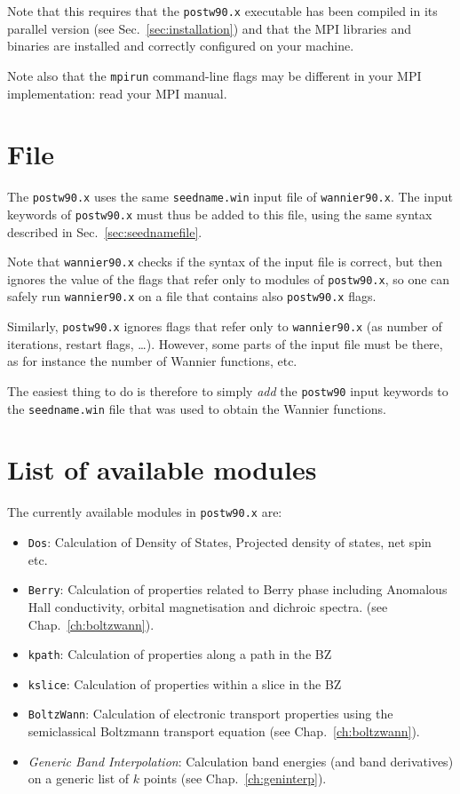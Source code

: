 Note that this requires that the {\tt postw90.x} executable has been
compiled in its parallel version (see Sec.~\ref{sec:installation}) and
that the MPI libraries and binaries are installed and correctly
configured on your machine.

Note also that the {\tt mpirun} command-line flags may be different in your MPI implementation: read your MPI manual.


\section{ File}
The \texttt{postw90.x} uses the same \texttt{seedname.win} input file
of \texttt{wannier90.x}. The input keywords of \texttt{postw90.x} must
thus be added to this file, using the same syntax described in
Sec.~\ref{sec:seednamefile}. 

Note that \texttt{wannier90.x} checks if the syntax of the input file
is correct, but then ignores the value of the flags that refer only to
modules of \texttt{postw90.x}, so one can safely run
\texttt{wannier90.x} on a file that contains also \texttt{postw90.x}
flags.

Similarly, \texttt{postw90.x} ignores flags that refer only to
\texttt{wannier90.x} (as number of iterations, restart flags,
\ldots). However, some parts of the input file must be there, as for
instance the number of Wannier functions, etc.

The easiest thing to do
is therefore to simply \emph{add} the \texttt{postw90} input keywords to
the \texttt{seedname.win} file that was used
to obtain the Wannier functions.

\section{List of available modules}
The currently available modules in \texttt{postw90.x} are:
\begin{itemize}
\item \texttt{Dos}: Calculation of Density of States, Projected
  density of states, net spin etc.
\item \texttt{Berry}: Calculation of properties related to Berry phase
  including Anomalous Hall conductivity, orbital magnetisation and
  dichroic spectra.
 (see Chap.~\ref{ch:boltzwann}).
\item \texttt{kpath}: Calculation of properties along a path in the BZ 
\item \texttt{kslice}: Calculation of properties within a slice in the BZ 
\item \texttt{BoltzWann}: Calculation of electronic transport
  properties using the semiclassical Boltzmann transport equation (see Chap.~\ref{ch:boltzwann}).
\item \emph{Generic Band Interpolation}: Calculation band energies (and band
  derivatives) on a generic list of $k$ points (see Chap.~\ref{ch:geninterp}).
\end{itemize}

